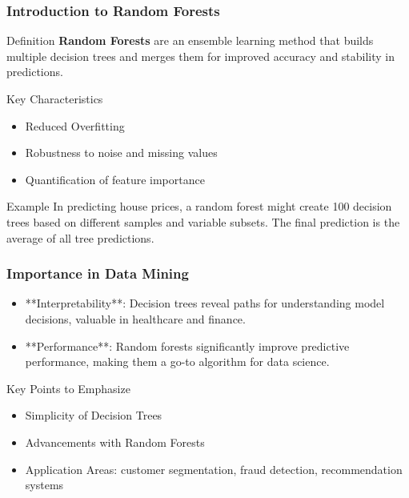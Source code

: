 \documentclass[aspectratio=169]{beamer}
\begin{document}
\begin{frame}[fragile]
    \frametitle{Introduction to Random Forests}
    \begin{block}{Definition}
        \textbf{Random Forests} are an ensemble learning method that builds multiple decision trees and merges them for improved accuracy and stability in predictions.
    \end{block}
    \begin{block}{Key Characteristics}
        \begin{itemize}
            \item Reduced Overfitting
            \item Robustness to noise and missing values
            \item Quantification of feature importance
        \end{itemize}
    \end{block}
    
    \begin{block}{Example}
        In predicting house prices, a random forest might create 100 decision trees based on different samples and variable subsets. The final prediction is the average of all tree predictions.
    \end{block}
\end{frame}

\begin{frame}[fragile]
    \frametitle{Importance in Data Mining}
    \begin{itemize}
        \item **Interpretability**: Decision trees reveal paths for understanding model decisions, valuable in healthcare and finance.
        \item **Performance**: Random forests significantly improve predictive performance, making them a go-to algorithm for data science.
    \end{itemize}

    \begin{block}{Key Points to Emphasize}
        \begin{itemize}
            \item Simplicity of Decision Trees
            \item Advancements with Random Forests
            \item Application Areas: customer segmentation, fraud detection, recommendation systems
        \end{itemize}
    \end{block}
\end{frame}
\end{document}
